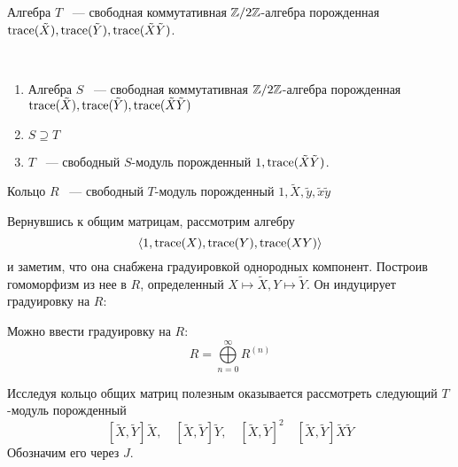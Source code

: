 \begin{proposition}
    Алгебра $T$ ~--- свободная коммутативная $\mathbb{Z}/2\mathbb{Z}$-алгебра порожденная $\mathrm{trace}(\tilde{X}), \mathrm{trace}(\tilde{Y}), \mathrm{trace}(\tilde{X}\tilde{Y})$.
\end{proposition}
\begin{proposition}\\
    \begin{enumerate}
        \item Алгебра $S$ ~--- свободная коммутативная $\mathbb{Z}/2\mathbb{Z}$-алгебра порожденная $\mathrm{trace}(\tilde{X}), \mathrm{trace}(\tilde{Y}), \mathrm{trace}(\tilde{X}\tilde{Y})$
        \item $S\supseteq T$
        \item $T$ ~--- свободный  $S$-модуль порожденный $1, \mathrm{trace}(\tilde{X}\tilde{Y})$.
    \end{enumerate}
\end{proposition}
\begin{proposition}
    Кольцо $R$ ~--- свободный $T$-модуль порожденный $1, \tilde{X}, \tilde{y}, \tilde{x}\tilde{y}$
\end{proposition}
Вернувшись к общим матрицам, рассмотрим алгебру
\[
    \langle 1, \mathrm{trace}(X), \mathrm{trace}(Y), \mathrm{trace}(XY) \rangle
\]
и заметим, что она снабжена градуировкой однородных компонент.
Построив гомоморфизм из нее в $R$, определенный $X\mapsto \tilde{X}, Y\mapsto\tilde{Y}$.
Он индуцирует градуировку на $R$:
\begin{proposition}
    Можно ввести градуировку на $R$:
    \[
        R = \bigoplus\limits_{n=0}^{\infty} R^{(n)}
    \]
\end{proposition}

Исследуя кольцо общих матриц полезным оказывается рассмотреть следующий $T$-модуль порожденный
\[
    [\tilde{X}, \tilde{Y}] \tilde{X}, \quad [\tilde{X}, \tilde{Y}] \tilde{Y}, \quad [\tilde{X}, \tilde{Y}]^2 \quad [\tilde{X}, \tilde{Y}]\tilde{X}\tilde{Y}
\]
Обозначим его через $J$.

